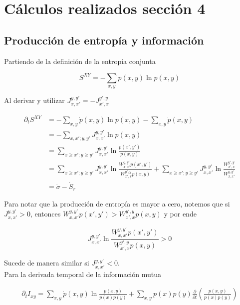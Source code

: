 \begin{appendixs}
\label{apendix:thermolaws}

\newpage 

    \section{Cálculos realizados sección 4}
    \subsection{Producción de entropía y información}
    Partiendo de la definición de la entropía conjunta

    \begin{equation*}
        S^{XY} = - \sum_{x,y}p(x,y) \ln p(x,y)
    \end{equation*}

    Al derivar y utilizar $J_{x,x'}^{y,y'} = - J_{x',x}^{y',y}$

    \begin{align*}
        \partial_{t}S^{XY} & = - \sum_{x,y} \dot{p}(x,y) \ln p(x,y) - \sum_{x,y} \dot{p}(x,y) \\
                           & = - \sum_{x,x';y,y'} J_{x,x'}^{y,y'} \ln p(x,y)  \\
                           & = \sum_{x \geq x'; y\geq y'} J_{x,x'}^{y,y'} \ln \frac{p(x',y')}{p(x,y)} \\
                           & = \sum_{x \geq x'; y\geq y'} J_{x,x'}^{y,y'} \ln \frac{W_{x,x'}^{y,y'} p(x',y')}{W_{x',x}^{y',y} p(x,y)} +  \sum_{x \geq x'; y\geq y'} J_{x,x'}^{y,y'} \ln \frac{W_{x',x}^{y',y} }{W_{x,x'}^{y,y'} } \\
                           & = \dot{\sigma} - \dot{S}_{r}
    \end{align*}

Para notar que la producción de entropía es mayor a cero, notemos que si $J_{x,x'}^{y,y'} > 0$, entonces $W_{x,x'}^{y,y'}p(x',y') > W_{x',x}^{y',y}p(x,y) $  y por ende

\begin{equation*}
    J_{x,x'}^{y,y'} \ln \frac{ W_{x,x'}^{y,y'}p(x',y') }{ W_{x',x}^{y',y}p(x,y) } > 0
\end{equation*}

Sucede de manera similar si $J_{x,x'}^{y,y'}<0$.\\
 Para la derivada temporal de la información mutua 

\begin{align*}
    \partial_{t} I_{xy} = \sum_{x,y}\dot{p}(x,y) \ln \frac{p(x,y) }{ p(x)p(y) } + \sum_{x,y}p(x)p(y) \frac{\partial}{\partial t} \left( \frac{p(x,y)}{p(x)p(y)} \right)
 \end{align*}


\end{appendixs}

